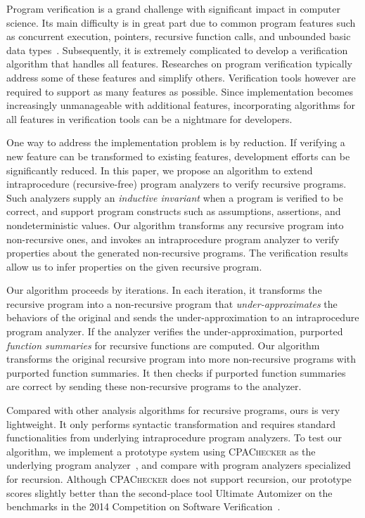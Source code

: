 Program verification is a grand challenge with significant impact in computer science.
Its main difficulty is in great part due to common program features such as concurrent execution,  pointers,  recursive function calls,  and unbounded basic data types~\cite{ClarkeJS05}. Subsequently, it is extremely complicated to develop a verification algorithm that handles all features. Researches on program verification typically address some of these features and simplify others. Verification tools however are required to support as many features as possible. Since implementation becomes increasingly unmanageable with additional features, incorporating algorithms for all features in verification tools can be a nightmare for developers.

One way to address the implementation problem is by reduction. If verifying a new feature can be transformed to existing features, development efforts can be significantly reduced.
In this paper, we propose an algorithm to extend intraprocedure (recursive-free) program analyzers to verify recursive programs. Such analyzers supply an \emph{inductive invariant} when a program is verified to be correct, and support program constructs such as assumptions, assertions, and nondeterministic values. Our algorithm transforms any recursive program into non-recursive ones, and invokes an intraprocedure program analyzer to verify properties about the generated non-recursive programs. The verification results allow us to infer properties on the given recursive program.

Our algorithm proceeds by iterations. In each iteration, it transforms the recursive program into a non-recursive program that \emph{under-approximates} the behaviors of the original and sends the under-approximation to an intraprocedure program analyzer. If the analyzer verifies the under-approximation, purported \emph{function summaries} for recursive functions are computed. Our algorithm transforms the original recursive program into more non-recursive programs with purported function summaries. It then checks if purported function summaries are correct by sending these non-recursive programs to the analyzer.

Compared with other analysis algorithms for recursive programs, ours is very lightweight. It only performs syntactic transformation and requires standard functionalities from underlying intraprocedure program analyzers. To test our algorithm, we implement a prototype system using \textsc{CPAChecker} as the underlying program analyzer~\cite{BeyerK11}, and compare with program analyzers specialized for recursion. Although \textsc{CPAChecker} does not support recursion, our prototype scores slightly better than the second-place tool Ultimate Automizer on the benchmarks in the 2014 Competition on Software Verification~\cite{svcomp14}. 

